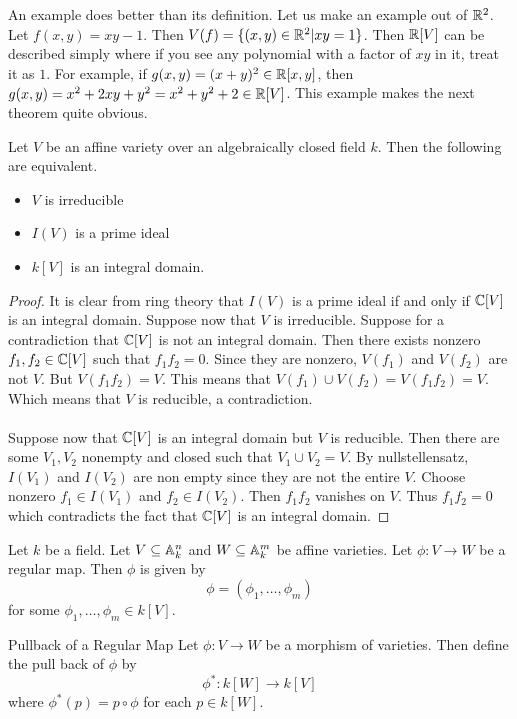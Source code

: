\documentclass[a4paper]{article}
\begin{document}
An example does better than its definition. Let us make an example out of $\mathbb{R}^2$. Let $f(x,y)=xy-1$. Then $V(f)=\{(x,y)\in\mathbb{R}^2|xy=1\}$. Then $\mathbb{R}[V]$ can be described simply where if you see any polynomial with a factor of $xy$ in it, treat it as $1$. For example, if $g(x,y)=(x+y)^2\in\mathbb{R}[x,y]$, then $g(x,y)=x^2+2xy+y^2=x^2+y^2+2\in\mathbb{R}[V]$. This example makes the next theorem quite obvious. 

\begin{prp}{}{} Let $V$ be an affine variety over an algebraically closed field $k$. Then the following are equivalent. 
\begin{itemize}
\item $V$ is irreducible
\item $I(V)$ is a prime ideal
\item $k[V]$ is an integral domain. 
\end{itemize}\tcbline
\begin{proof}
It is clear from ring theory that $I(V)$ is a prime ideal if and only if $\mathbb{C}[V]$ is an integral domain. Suppose now that $V$ is irreducible. Suppose for a contradiction that $\mathbb{C}[V]$ is not an integral domain. Then there exists nonzero $f_1,f_2\in\mathbb{C}[V]$ such that $f_1f_2=0$. Since they are nonzero, $V(f_1)$ and $V(f_2)$ are not $V$. But $V(f_1f_2)=V$. This means that $V(f_1)\cup V(f_2)=V(f_1f_2)=V$. Which means that $V$ is reducible, a contradiction. \\~\\
Suppose now that $\mathbb{C}[V]$ is an integral domain but $V$ is reducible. Then there are some $V_1,V_2$ nonempty and closed such that $V_1\cup V_2=V$. By nullstellensatz, $I(V_1)$ and $I(V_2)$ are non empty since they are not the entire $V$. Choose nonzero $f_1\in I(V_1)$ and $f_2\in I(V_2)$. Then $f_1f_2$ vanishes on $V$. Thus $f_1f_2=0$ which contradicts the fact that $\mathbb{C}[V]$ is an integral domain. 
\end{proof}
\end{prp}

\begin{prp}{}{} Let $k$ be a field. Let $V\subseteq\mathbb{A}_k^n$ and $W\subseteq\mathbb{A}_k^m$ be affine varieties. Let $\phi:V\to W$ be a regular map. Then $\phi$ is given by $$\phi=(\phi_1,\dots,\phi_m)$$ for some $\phi_1,\dots,\phi_m\in k[V]$. 
\end{prp}

\begin{defn}{Pullback of a Regular Map}{} Let $\phi:V\to W$ be a morphism of varieties. Then define the pull back of $\phi$ by $$\phi^\ast:k[W]\to k[V]$$ where $\phi^\ast(p)=p\circ\phi$ for each $p\in k[W]$. 
\end{defn}
\end{document}
